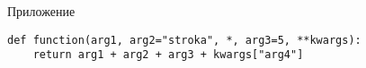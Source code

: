 \newpage


\begin{center}
    \huge    Приложение
\end{center}

\begin{verbatim}
def function(arg1, arg2="stroka", *, arg3=5, **kwargs):
    return arg1 + arg2 + arg3 + kwargs["arg4"]
\end{verbatim}
